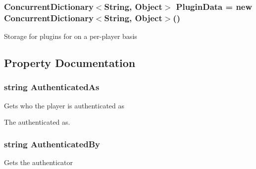 \hypertarget{classOTA_1_1BasePlayer_a9e32cc779b1659f2752ee5564650f5f1}{}
\subsubsection[{Plugin\+Data}]{\setlength{\rightskip}{0pt plus 5cm}Concurrent\+Dictionary$<$String, Object$>$ Plugin\+Data = new Concurrent\+Dictionary$<$String, Object$>$()}\label{classOTA_1_1BasePlayer_a9e32cc779b1659f2752ee5564650f5f1}


Storage for plugins for on a per-\/player basis 



\subsection{Property Documentation}
\hypertarget{classOTA_1_1BasePlayer_a99abed4b5ac2cf92871687dc00bf7f66}{}
\subsubsection[{Authenticated\+As}]{\setlength{\rightskip}{0pt plus 5cm}string Authenticated\+As\hspace{0.3cm}{\ttfamily [get]}}\label{classOTA_1_1BasePlayer_a99abed4b5ac2cf92871687dc00bf7f66}


Gets who the player is authenticated as 

The authenticated as.\hypertarget{classOTA_1_1BasePlayer_a285fa2c208fa2471fb593dfd2f95329c}{}
\subsubsection[{Authenticated\+By}]{\setlength{\rightskip}{0pt plus 5cm}string Authenticated\+By\hspace{0.3cm}{\ttfamily [get]}}\label{classOTA_1_1BasePlayer_a285fa2c208fa2471fb593dfd2f95329c}


Gets the authenticator 

